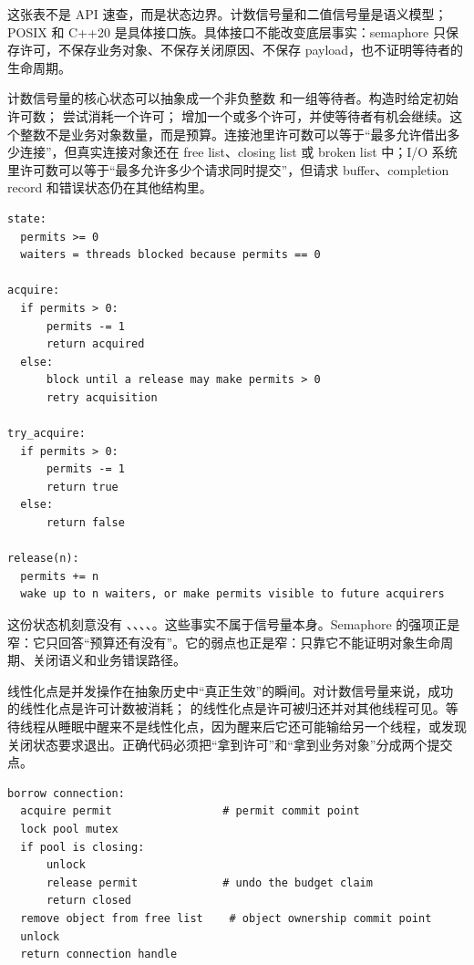 这张表不是 API 速查，而是状态边界。计数信号量和二值信号量是语义模型；POSIX 和 C++20 是具体接口族。具体接口不能改变底层事实：semaphore 只保存许可，不保存业务对象、不保存关闭原因、不保存 payload，也不证明等待者的生命周期。

计数信号量的核心状态可以抽象成一个非负整数  和一组等待者。构造时给定初始许可数； 尝试消耗一个许可； 增加一个或多个许可，并使等待者有机会继续。这个整数不是业务对象数量，而是预算。连接池里许可数可以等于“最多允许借出多少连接”，但真实连接对象还在 free list、closing list 或 broken list 中；I/O 系统里许可数可以等于“最多允许多少个请求同时提交”，但请求 buffer、completion record 和错误状态仍在其他结构里。

\begin{lstlisting}[numbers=none,caption={counting semaphore 的最小状态机}]
state:
  permits >= 0
  waiters = threads blocked because permits == 0

acquire:
  if permits > 0:
      permits -= 1
      return acquired
  else:
      block until a release may make permits > 0
      retry acquisition

try_acquire:
  if permits > 0:
      permits -= 1
      return true
  else:
      return false

release(n):
  permits += n
  wake up to n waiters, or make permits visible to future acquirers
\end{lstlisting}

这份状态机刻意没有 、、、、。这些事实不属于信号量本身。Semaphore 的强项正是窄：它只回答“预算还有没有”。它的弱点也正是窄：只靠它不能证明对象生命周期、关闭语义和业务错误路径。

线性化点是并发操作在抽象历史中“真正生效”的瞬间。对计数信号量来说，成功  的线性化点是许可计数被消耗； 的线性化点是许可被归还并对其他线程可见。等待线程从睡眠中醒来不是线性化点，因为醒来后它还可能输给另一个线程，或发现关闭状态要求退出。正确代码必须把“拿到许可”和“拿到业务对象”分成两个提交点。

\begin{lstlisting}[numbers=none,caption={许可提交点和对象提交点不能混在一起}]
borrow connection:
  acquire permit                 # permit commit point
  lock pool mutex
  if pool is closing:
      unlock
      release permit             # undo the budget claim
      return closed
  remove object from free list    # object ownership commit point
  unlock
  return connection handle
\end{lstlisting}

